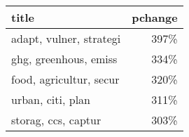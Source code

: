 \begin{tabular}{lr}
\toprule
                   title &  pchange \\
\midrule
 adapt, vulner, strategi &     397\% \\
   ghg, greenhous, emiss &     334\% \\
 food, agricultur, secur &     320\% \\
       urban, citi, plan &     311\% \\
     storag, ccs, captur &     303\% \\
\bottomrule
\end{tabular}
